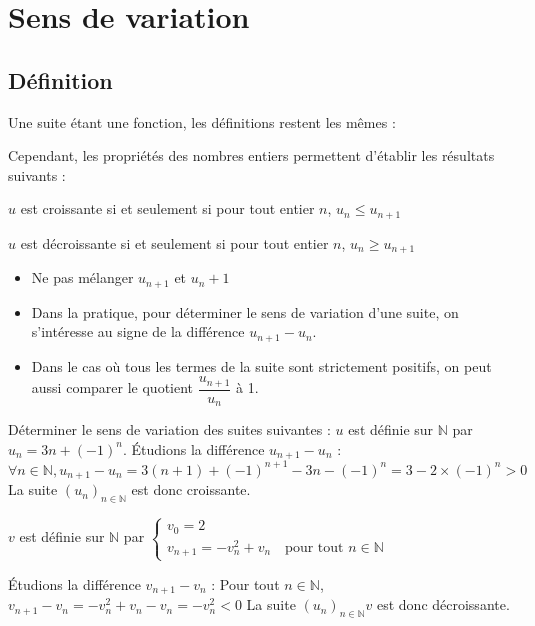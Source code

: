 \documentclass[french]{book}
\newcommand{\N}{\mathbb {N}}
\newcommand{\se}{\geq}
\newcommand{\ie}{\leq}
\newcommand{\suite}[1][u]{\left( #1_{n} \right)_{n\in\N}}
\begin{document}
\section{Sens de variation}
\subsection{Définition}
Une suite étant une fonction, les définitions restent les mêmes :


Cependant, les propriétés des nombres entiers permettent d'établir les résultats suivants :

\begin{prop}
$u$ est croissante si et seulement si pour tout entier $n$, $u_{n}\ie u_{n+1}$
\par $u$ est décroissante si et seulement si pour tout entier $n$, $u_{n}\se u_{n+1}$
\end{prop}

\begin{rem}
\begin{itemize}
\item Ne pas mélanger $u_{n+1}$ et $u_{n}+1$
\item Dans la pratique, pour déterminer le sens de variation d'une suite, on s'intéresse au signe de la différence $u_{n+1}-u_{n}$.
\item Dans le cas où tous les termes de la suite sont strictement positifs, on peut aussi comparer le quotient $\dfrac{u_{n+1}}{u_{n}}$ à 1.
\end{itemize}
\end{rem}

\begin{exemple}
Déterminer le sens de variation des suites suivantes :
 $u$ est définie sur $\N$ par $u_{n}=3n+(-1)^{n}$.
 Étudions la différence $u_{n+1}-u_{n}$ :
 $$\forall n\in\N, u_{n+1}-u_{n}=3(n+1)+(-1)^{n+1}-3n-(-1)^{n}=3-2\times(-1)^{n}>0$$
 La suite $\suite[u]$ est donc croissante.
\end{exemple}

\begin{exemple}
$v$ est définie sur $\N$ par 
$\left\{\begin{array}{l}
v_0=2\\
v_{n+1}=-v_{n}^2+v_{n} \quad \text{pour tout } n\in\N
\end{array}\right.$

 Étudions la différence $v_{n+1}-v_{n}$ :
 Pour tout $n\in\N$, $v_{n+1}-v_{n}=-v_{n}^2+v_{n}-v_{n}=-v_{n}^2<0$
 La suite $\suite{v}$ est donc décroissante.
\end{exemple}
\end{document}

